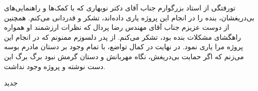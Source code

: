 


\begin{center}
\end{center}

‌تورفتگی از استاد بزرگوارم جناب آقای دکتر نوبهاری که با کمک‌ها و راهنمایی‌های بی‌دریغشان، بنده را در انجام این پروژه یاری داده‌اند، تشکر و قدردانی می‌کنم.
همچنین از دوست عزیزم جناب آقای مهندس رضا پردال که نظرات ارزشمند او همواره راهگشای مشکلات بنده بود، تشکر می‌کنم.
از پدر دلسوزم ممنونم که در انجام این پروژه مرا یاری نمود. در نهایت در کمال تواضع، با تمام وجود بر دستان مادرم بوسه می‌زنم که اگر حمایت بی‌دریغش، نگاه مهربانش و دستان گرمش نبود برگ برگ این دست نوشته و پروژه وجود نداشت.

‌جدید
